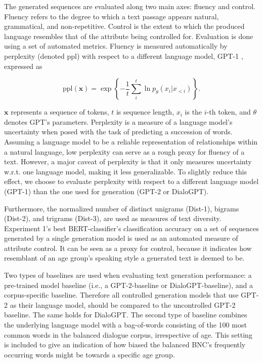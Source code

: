 The generated sequences are evaluated along two main axes: fluency and control. Fluency refers to the degree to which a text passage appears natural, grammatical, and non-repetitive. Control is the extent to which the produced language resembles that of the attribute being controlled for. Evaluation is done using a set of automated metrics. Fluency is measured automatically by perplexity (denoted ppl) with respect to a different language model, GPT-1 \citep{radford2018improving}, expressed as

\begin{equation}
    \text{ppl}(\textbf{x}) = \exp \left\{ - \frac{1}{t} \sum_{i}^t \ln p_{\theta}(x_i | x_{<i})\right\}.    
\end{equation}

$\textbf{x}$ represents a sequence of tokens, $t$ is sequence length, $x_i$ is the $i$-th token, and $\theta$ denotes GPT's parameters. Perplexity is a measure of a language model's uncertainty when posed with the task of predicting a succession of words. Assuming a language model to be a reliable representation of relationships within a natural language, low perplexity can serve as a rough proxy for fluency of a text. However, a major caveat of perplexity is that it only measures uncertainty w.r.t. one language model, making it less generalizable. To slightly reduce this effect, we choose to evaluate perplexity with respect to a different language model (GPT-1) than the one used for generation (GPT-2 or DialoGPT).

Furthermore, the normalized number of distinct unigrams (Dist-1), bigrams (Dist-2), and trigrams (Dist-3), are used as measures of text diversity. Experiment 1's best BERT-classifier's classification accuracy on a set of sequences generated by a single generation model is used as an automated measure of attribute control. It can be seen as a proxy for control, because it indicates how resemblant of an age group's speaking style a generated text is deemed to be.

Two types of baselines are used when evaluating text generation performance: a pre-trained model baseline (i.e., a GPT-2-baseline or DialoGPT-baseline), and a corpus-specific baseline. 
Therefore all controlled generation models that use GPT-2 as their language model, should be compared to the uncontrolled GPT-2 baseline. The same holds for DialoGPT. The second type of baseline combines the underlying language model with a bag-of-words consisting of the 100 most common words in the balanced dialogue corpus, irrespective of age. This setting is included to give an indication of how biased the balanced BNC's frequently occurring words might be towards a specific age group.

